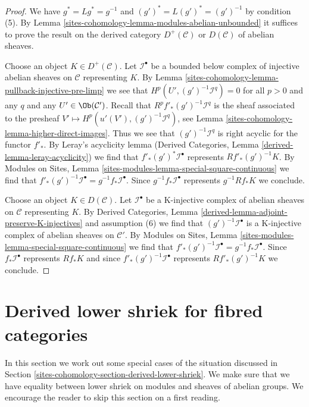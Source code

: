 \begin{proof}
We have $g^* = Lg^* = g^{-1}$ and $(g')^* = L(g')^* = (g')^{-1}$
by condition (5).
By Lemma \ref{sites-cohomology-lemma-modules-abelian-unbounded} it suffices
to prove the result on the derived category $D^+(\mathcal{C})$ or
$D(\mathcal{C})$ of abelian sheaves.

\medskip\noindent
Choose an object $K \in D^+(\mathcal{C})$.
Let $\mathcal{I}^\bullet$ be a bounded below complex of injective abelian
sheaves on $\mathcal{C}$ representing $K$. By
Lemma \ref{sites-cohomology-lemma-pullback-injective-pre-limp}
we see that $H^p(U', (g')^{-1}\mathcal{I}^q) = 0$ for
all $p > 0$ and any $q$ and any $U' \in \Ob(\mathcal{C}')$.
Recall that $R^pf'_*(g')^{-1}\mathcal{I}^q$ is the sheaf
associated to the presheaf $V' \mapsto H^p(u'(V'), (g')^{-1}\mathcal{I}^q)$,
see Lemma \ref{sites-cohomology-lemma-higher-direct-images}.
Thus we see that $(g')^{-1}\mathcal{I}^q$ is right acyclic
for the functor $f'_*$. By Leray's acyclicity lemma
(Derived Categories, Lemma \ref{derived-lemma-leray-acyclicity})
we find that $f'_*(g')^*\mathcal{I}^\bullet$
represents $Rf'_*(g')^{-1}K$.
By Modules on Sites, Lemma
\ref{sites-modules-lemma-special-square-continuous}
we find that $f'_*(g')^{-1}\mathcal{I}^\bullet = g^{-1}f_*\mathcal{I}^\bullet$.
Since $g^{-1}f_*\mathcal{I}^\bullet$ represents $g^{-1}Rf_*K$
we conclude.

\medskip\noindent
Choose an object $K \in D(\mathcal{C})$.
Let $\mathcal{I}^\bullet$ be a K-injective complex of abelian
sheaves on $\mathcal{C}$ representing $K$. By
Derived Categories, Lemma \ref{derived-lemma-adjoint-preserve-K-injectives}
and assumption (6) we find that $(g')^{-1}\mathcal{I}^\bullet$
is a K-injective complex of abelian sheaves on $\mathcal{C}'$.
By Modules on Sites, Lemma
\ref{sites-modules-lemma-special-square-continuous}
we find that $f'_*(g')^{-1}\mathcal{I}^\bullet = g^{-1}f_*\mathcal{I}^\bullet$.
Since $f_*\mathcal{I}^\bullet$ represents $Rf_*K$ and since
$f'_*(g')^{-1}\mathcal{I}^\bullet$ represents $Rf'_*(g')^{-1}K$
we conclude.
\end{proof}

\section{Derived lower shriek for fibred categories}
\label{sites-cohomology-section-derived-lower-shriek-fibred}
In this section we work out some special cases of the situation
discussed in Section \ref{sites-cohomology-section-derived-lower-shriek}.
We make sure that we have equality between lower shriek on modules
and sheaves of abelian groups. We encourage the reader to skip
this section on a first reading.

